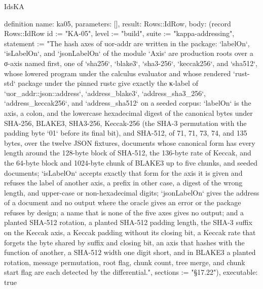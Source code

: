 \begin{lexlean}{IdsKA}
\begin{semanticmodule}
definition{
  name: ka05,
  parameters: [],
  result: Rows::IdRow,
  body: (record Rows::IdRow {id := "KA-05", level := "build", suite := "kappa-addressing", statement := "The hash axes of uor-addr are written in the package: `labelOn`, `isLabelOn`, and `jsonLabelOn` of the module `Axis` are production roots over a σ-axis named first, one of `sha256`, `blake3`, `sha3-256`, `keccak256`, and `sha512`, whose lowered program under the calculus evaluator and whose rendered `rust-std` package under the pinned rustc give exactly the κ-label of `uor_addr::json::address`, `address_blake3`, `address_sha3_256`, `address_keccak256`, and `address_sha512` on a seeded corpus: `labelOn` is the axis, a colon, and the lowercase hexadecimal digest of the canonical bytes under SHA-256, BLAKE3, SHA3-256, Keccak-256 (the SHA-3 permutation with the padding byte `01` before its final bit), and SHA-512, of 71, 71, 73, 74, and 135 bytes, over the twelve JSON fixtures, documents whose canonical form has every length around the 128-byte block of SHA-512, the 136-byte rate of Keccak, and the 64-byte block and 1024-byte chunk of BLAKE3 up to five chunks, and seeded documents; `isLabelOn` accepts exactly that form for the axis it is given and refuses the label of another axis, a prefix in other case, a digest of the wrong length, and upper-case or non-hexadecimal digits; `jsonLabelOn` gives the address of a document and no output where the oracle gives an error or the package refuses by design; a name that is none of the five axes gives no output; and a planted SHA-512 rotation, a planted SHA-512 padding length, the SHA-3 suffix on the Keccak axis, a Keccak padding without its closing bit, a Keccak rate that forgets the byte shared by suffix and closing bit, an axis that hashes with the function of another, a SHA-512 width one digit short, and in BLAKE3 a planted rotation, message permutation, root flag, chunk count, tree merge, and chunk start flag are each detected by the differential.", sections := "§17.22"}),
  executable: true
}


\end{semanticmodule}
\end{lexlean}

